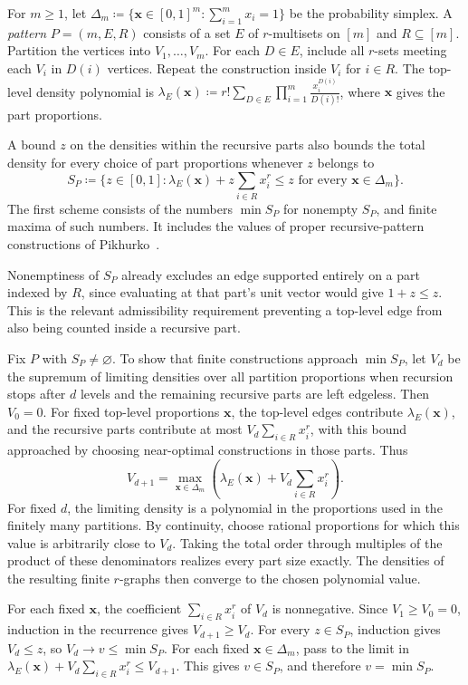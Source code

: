 \documentclass[10pt]{article}
\numberwithin{equation}{section}
\theoremstyle{definition}
\newcommand{\x}{\boldsymbol{x}}\newcommand{\y}{\boldsymbol{y}}
\begin{document}
For $m\ge1$, let $\Delta_m\coloneqq\{\x\in[0,1]^m\colon\sum_{i=1}^m x_i=1\}$ be the probability simplex. A \emph{pattern} $P=(m,E,R)$ consists of a set $E$ of $r$-multisets on $[m]$ and $R\subseteq[m]$. Partition the vertices into $V_1,\ldots,V_m$. For each $D\in E$, include all $r$-sets meeting each $V_i$ in $D(i)$ vertices. Repeat the construction inside $V_i$ for $i\in R$. The top-level density polynomial is $\lambda_E(\x)\coloneqq r!\sum_{D\in E}\prod_{i=1}^m\frac{x_i^{D(i)}}{D(i)!}$, where $\x$ gives the part proportions.

A bound $z$ on the densities within the recursive parts also bounds the total density for every choice of part proportions whenever $z$ belongs to
\[
 S_P\coloneqq\{z\in[0,1]\colon\lambda_E(\x)+z\sum_{i\in R}x_i^r\le z
                      \text{ for every }\x\in\Delta_m\}.
\]
The first scheme consists of the numbers $\min S_P$ for nonempty $S_P$, and finite maxima of such numbers. It includes the values of proper recursive-pattern constructions of Pikhurko~\cite{Pikhurko2014}.

Nonemptiness of $S_P$ already excludes an edge supported entirely on a part indexed by $R$, since evaluating at that part's unit vector would give $1+z\le z$. This is the relevant admissibility requirement preventing a top-level edge from also being counted inside a recursive part.

Fix $P$ with $S_P\ne\varnothing$. To show that finite constructions approach $\min S_P$, let $V_d$ be the supremum of limiting densities over all partition proportions when recursion stops after $d$ levels and the remaining recursive parts are left edgeless. Then $V_0=0$. For fixed top-level proportions $\x$, the top-level edges contribute $\lambda_E(\x)$, and the recursive parts contribute at most $V_d\sum_{i\in R}x_i^r$, with this bound approached by choosing near-optimal constructions in those parts. Thus
\[
 V_{d+1}=\max_{\x\in\Delta_m}
       \left(\lambda_E(\x)+V_d\sum_{i\in R}x_i^r\right).
\]
For fixed $d$, the limiting density is a polynomial in the proportions used in the finitely many partitions. By continuity, choose rational proportions for which this value is arbitrarily close to $V_d$. Taking the total order through multiples of the product of these denominators realizes every part size exactly. The densities of the resulting finite $r$-graphs then converge to the chosen polynomial value.

For each fixed $\x$, the coefficient $\sum_{i\in R}x_i^r$ of $V_d$ is nonnegative. Since $V_1\ge V_0=0$, induction in the recurrence gives $V_{d+1}\ge V_d$. For every $z\in S_P$, induction gives $V_d\le z$, so $V_d\to v\le\min S_P$. For each fixed $\x\in\Delta_m$, pass to the limit in $\lambda_E(\x)+V_d\sum_{i\in R}x_i^r\le V_{d+1}$. This gives $v\in S_P$, and therefore $v=\min S_P$.
\end{document}
